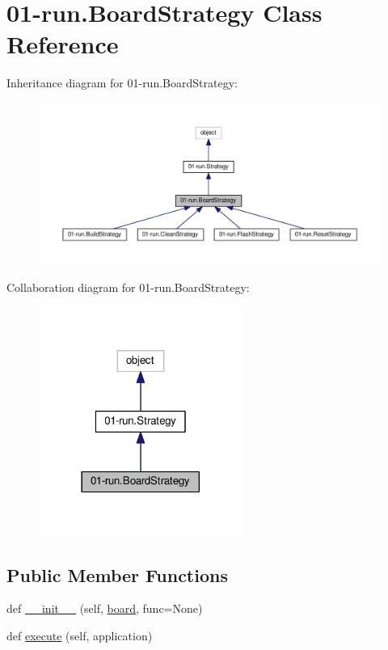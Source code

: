 \hypertarget{class01-run_1_1BoardStrategy}{}\section{01-\/run.Board\+Strategy Class Reference}
\label{class01-run_1_1BoardStrategy}


Inheritance diagram for 01-\/run.Board\+Strategy\+:
\nopagebreak
\begin{figure}[H]
\begin{center}
\leavevmode
\includegraphics[width=350pt]{class01-run_1_1BoardStrategy__inherit__graph}
\end{center}
\end{figure}


Collaboration diagram for 01-\/run.Board\+Strategy\+:
\nopagebreak
\begin{figure}[H]
\begin{center}
\leavevmode
\includegraphics[width=189pt]{class01-run_1_1BoardStrategy__coll__graph}
\end{center}
\end{figure}
\subsection*{Public Member Functions}
\begin{DoxyCompactItemize}
\item 
def \hyperlink{class01-run_1_1BoardStrategy_a631883dc0899e645522db930b2ca1452}{\+\_\+\+\_\+init\+\_\+\+\_\+} (self, \hyperlink{class01-run_1_1BoardStrategy_abf87e8d3a40c7d97f2b12934a630d9c2}{board}, func=None)
\item 
def \hyperlink{class01-run_1_1BoardStrategy_a82091d8b8fe9cbc8eba93a459e7cfb12}{execute} (self, application)
\end{DoxyCompactItemize}

